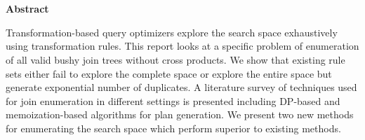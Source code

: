 \chapter*{}
\begin{center}
\textbf{Abstract}
\end{center}
Transformation-based query optimizers explore the search space exhaustively using transformation rules. This report looks at a specific problem of enumeration of all valid bushy join trees without cross products. We show that existing rule sets either fail to explore the complete space or explore the entire space but generate exponential number of duplicates. A literature survey of  techniques used for join enumeration in different settings is presented including DP-based and memoization-based algorithms for plan generation. We present two new methods for enumerating the search space which perform superior to existing methods.
